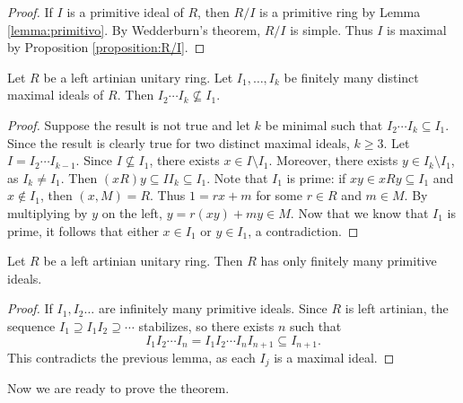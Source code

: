\begin{proof}
    If $I$ is a primitive ideal of $R$, then $R/I$ is a primitive ring
    by Lemma \ref{lemma:primitivo}. By Wedderburn's theorem, $R/I$ is
    simple. Thus $I$ is maximal by Proposition \ref{proposition:R/I}. 
\end{proof}

\begin{lemma}
    Let $R$ be a left artinian unitary ring.
    Let $I_1,\dots,I_k$ be finitely many distinct maximal ideals of $R$. 
    Then $I_2\cdots I_k\not\subseteq I_1$.   
\end{lemma}

\begin{proof}
    Suppose the result is not true and let $k$ be minimal
    such that $I_2\cdots I_k\subseteq I_1$. Since the result is clearly
    true for two distinct maximal ideals, $k\geq3$. Let $I=I_2\cdots I_{k-1}$. 
    Since $I\not\subseteq I_1$, there exists $x\in I\setminus I_1$. Moreover,  
    there exists $y\in I_k\setminus I_1$, as 
    $I_k\ne I_1$. 
    Then 
    $(xR)y\subseteq II_k\subseteq I_1$. Note that $I_1$ is prime: if $xy\in xRy\subseteq I_1$ and $x\not\in I_1$, 
    then $(x,M)=R$. Thus $1=rx+m$ for some $r\in R$ and $m\in M$. By multiplying by $y$ on the left, 
    $y=r(xy)+my\in M$. Now that we know that $I_1$ is prime, 
    it follows that either $x\in I_1$ or $y\in I_1$, a contradiction.   
\end{proof}

\begin{lemma}
    Let $R$ be a left artinian unitary ring. Then $R$ has only 
    finitely many primitive ideals.
\end{lemma}

\begin{proof}
    If $I_1,I_2\dots$ are infinitely many primitive ideals. 
    Since $R$ is left artinian, the sequence 
    $I_1\supseteq I_1I_2\supseteq\cdots$ stabilizes, so there
    exists $n$ such that 
    \[
    I_1I_2\cdots I_n=I_1I_2\cdots I_nI_{n+1}\subseteq I_{n+1}.
    \]
    This contradicts the previous lemma, 
    as each $I_j$ is a maximal ideal. 
\end{proof}

Now we are ready to prove the theorem. 


